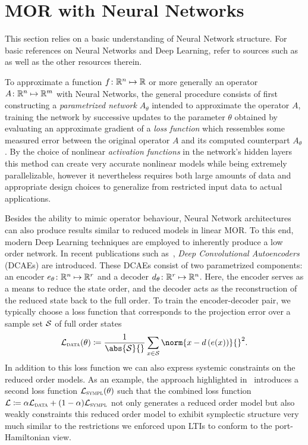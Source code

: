 \section{MOR with Neural Networks}\label{sec:nn-mor}

This section relies on a basic understanding of Neural Network structure.
For basic references on Neural Networks and Deep Learning, refer to sources such as~\cite{Goodfellow2016, Kubat2017, Sarker2021} as well as the other resources therein.

To approximate a function $f \colon \mathbb{R}^n \mapsto \mathbb{R}$ or more generally an operator $A \colon \mathbb{R}^n \mapsto \mathbb{R}^m$ with Neural Networks, the general procedure consists of first constructing a \emph{parametrized network} $A_\theta$ intended to approximate the operator $A$, training the network by successive updates to the parameter $\theta$ obtained by evaluating an approximate gradient of a \emph{loss function} which ressembles some measured error between the original operator $A$ and its computed counterpart $A_\theta$.
By the choice of nonlinear \emph{activation functions} in the network's hidden layers this method can create very accurate nonlinear models while being extremely parallelizable, however it nevertheless requires both large amounts of data and appropriate design choices to generalize from restricted input data to actual applications.

Besides the ability to mimic operator behaviour, Neural Network architectures can also produce results similar to reduced models in linear MOR.
To this end, modern Deep Learning techniques are employed to inherently produce a low order network.
In recent publications such as~\cite{Lee2020, Salvador2021, Benner2022, Kim2022, Buchfink2023}, \emph{Deep Convolutional Autoencoders} (DCAEs) are introduced.
These DCAEs consist of two parametrized components: an encoder $e_\theta \colon \mathbb{R}^n \mapsto \mathbb{R}^r$ and a decoder $d_\theta \colon \mathbb{R}^r \mapsto \mathbb{R}^n$.
Here, the encoder serves as a means to reduce the state order, and the decoder acts as the reconstruction of the reduced state back to the full order.
To train the encoder-decoder pair, we typically choose a loss function that corresponds to the projection error over a sample set $\mathcal{S}$ of full order states
\begin{equation}\label{eq:reduction-loss}
    \mcl{L}_{\msc{data}}(\theta) \coloneqq \frac{1}{\abs{\mcl{S}}{}} \sum\limits_{x \in \mcl{S}} \norm{x - d\left( e(x) \right)}{}^2.
\end{equation}
In addition to this loss function we can also express systemic constraints on the reduced order models.
As an example, the approach highlighted in~\cite{Buchfink2023} introduces a second loss function $\mathcal{L}_{\textnormal{\scshape sympl}}(\theta)$ such that the combined loss function $\mathcal{L} \coloneqq \alpha \mathcal{L}_{\textnormal{\scshape data}} + (1 - \alpha) \mathcal{L}_{\textnormal{\scshape sympl}}$ not only generates a reduced order model but also weakly constraints this reduced order model to exhibit symplectic structure very much similar to the restrictions we enforced upon \acp{LTI} to conform to the port-Hamiltonian view.

